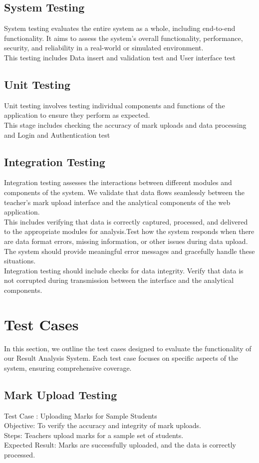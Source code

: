\documentclass{nascproject}
\begin{document}
\subsection{System Testing}
System testing evaluates the entire system as a whole, including end-to-end functionality. It aims to assess the system's overall functionality, performance, security, and reliability in a real-world or simulated environment. \\
This testing includes Data insert and validation test and User interface test
\subsection{Unit Testing}
Unit testing involves testing individual components and functions of the application to ensure they perform as expected.\\
This stage includes checking the accuracy of mark uploads and data processing and  Login and Authentication test
\subsection{Integration Testing}
Integration testing assesses the interactions between different modules and components of the system. We validate that data flows seamlessly between the teacher's mark upload interface and the analytical components of the web application.\\
This includes verifying that data is correctly captured, processed, and delivered to the appropriate modules for analysis.Test how the system responds when there are data format errors, missing information, or other issues during data upload. The system should provide meaningful error messages and gracefully handle these situations.\\
Integration testing should include checks for data integrity. Verify that data is not corrupted during transmission between the interface and the analytical components.


\section{Test Cases}
In this section, we outline the test cases designed to evaluate the functionality of our Result Analysis System. Each test case focuses on specific aspects of the system, ensuring comprehensive coverage.
\subsection{Mark Upload Testing}
Test Case : Uploading Marks for Sample Students\\
Objective: To verify the accuracy and integrity of mark uploads.\\
Steps: Teachers upload marks for a sample set of students.\\
Expected Result: Marks are successfully uploaded, and the data is correctly processed.
\end{document}
